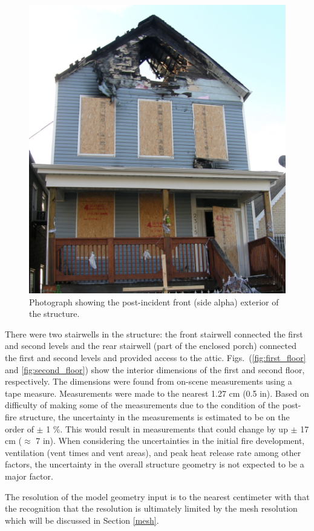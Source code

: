 \documentclass[11pt,oneside]{book}
\begin{document}
\begin{figure}[h!]
\centering
\includegraphics[width=.65\textwidth]{../Figures/exterior_alpha}
\caption{Photograph showing the post-incident front (side alpha) exterior of the structure.}
\label{fig:alpha_ex}
\end{figure}

There were two stairwells in the structure: the front stairwell connected the first and second levels and the rear stairwell (part of the enclosed porch) connected the first and second levels and provided access to the attic. Figs.~(\ref{fig:first_floor} and \ref{fig:second_floor}) show the interior dimensions of the first and second floor, respectively. The dimensions were found from on-scene measurements using a tape measure. Measurements were made to the nearest 1.27 cm (0.5 in). Based on difficulty of making some of the measurements due to the condition of the post-fire structure, the uncertainty in the measurements is estimated to be on the order of $\pm$ 1 \%. This would result in measurements that could change by up $\pm$ 17 cm ($\approx$ 7 in). When considering the uncertainties in the initial fire development, ventilation (vent times and vent areas), and peak heat release rate among other factors, the uncertainty in the overall structure geometry is not expected to be a major factor.

The resolution of the model geometry input is to the nearest centimeter with that the recognition that the resolution is ultimately limited by the mesh resolution which will be discussed in Section \ref{mesh}. 

\end{document}
